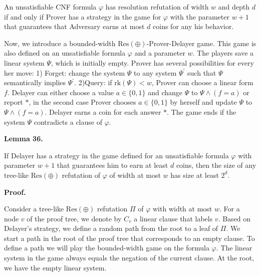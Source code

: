\documentclass[10pt,a4paper]{article}
\begin{document}
An unsatisfiable CNF formula $\varphi$ has resolution refutation of width $w$ and depth $d$ if and only if Prover has a strategy in the game for $\varphi$ with the parameter $w+1$ that guarantees that Adversary earns at most $d$ coins for any his behavior.\par




Now, we introduce a bounded-width $\mathrm{Res}(\oplus)$-Prover-Delayer game. This game is also defined on an unsatisfiable formula $\varphi$ and a parameter $w$. The players save a linear system $\Psi$, which is initially empty. Prover has several possibilities for every her move: 1) Forget: change the system $\Psi$ to any system $\Psi^{\prime}$ such that $\Psi$ semantically implies $\Psi^{\prime}$. 2)Query: if $\mathrm{rk}(\Psi)<w$, Prover can choose a linear form $f$. Delayer can either choose a value $a\in\{0,1\}$ and change $\Psi$ to $\Psi\land(f=a)$ or report $*$, in the second case Prover chooses $a\in\{0,1\}$ by herself and update $\Psi$ to $\Psi\land(f=a)$. Delayer earns a coin for each answer $*$. The game ends if the system $\Psi$ contradicts a clause of $\varphi$.\par



\par\medskip\noindent\textbf{
Lemma 36.
}\par



If Delayer has a strategy in the game defined for an unsatisfiable formula $\varphi$ with parameter $w+1$ that guarantees him to earn at least $d$ coins, then the size of any tree-like $\mathrm{Res}(\oplus)$ refutation of $\varphi$ of width at most $w$ has size at least $2^{d}$.\par



\par\medskip\noindent\textbf{Proof.}\par


Consider a tree-like $\mathrm{Res}(\oplus)$ refutation $\Pi$ of $\varphi$ with width at most $w$.
For a node $v$ of the proof tree, we denote by $C_{v}$ a linear clause that labels $v$.
Based on Delayer’s strategy, we define a random path from the root to a leaf of $\Pi$. We start a path in the root of the proof tree that corresponds to an empty clause.
To define a path we will play the bounded-width game on the formula $\varphi$.
The linear system in the game always equals the negation of the current clause. At the root, we have the empty linear system.\par
\end{document}
